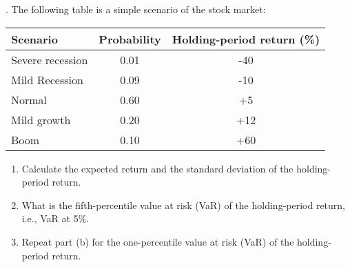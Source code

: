 \documentclass[11.5pt]{article}
\begin{document}
\newpage



. The following table is a simple scenario of the stock market:

\begin{table}[h]
	\begin{tabular}{lcc}
		\hline
		Scenario         & Probability & Holding-period   return (\%) \\ \hline
		Severe recession & 0.01        & -40                          \\
		Mild Recession   & 0.09        & -10                          \\
		Normal           & 0.60        & +5                           \\
		Mild growth      & 0.20        & +12                          \\
		Boom             & 0.10        & +60                          \\ \hline
	\end{tabular}
\end{table}


\begin{enumerate}[a]
	\item Calculate the expected return and the standard deviation of the holding-period return.
	
	\item  What is the fifth-percentile value at risk (VaR) of the holding-period return, i.e., VaR at 5\%.
	
	\item  Repeat part (b) for the one-percentile value at risk (VaR) of the holding-period return. 

\end{enumerate}

%
%
%
%
%
%
%	
%	
\end{document}
